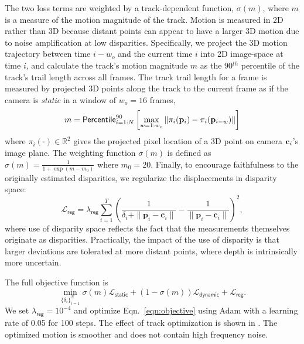 The two loss terms are weighted by a track-dependent function, $\sigma(m)$, where $m$ is a measure of the motion magnitude of the track. Motion is measured in 2D rather than 3D because distant points can appear to have a larger 3D motion due to noise amplification at low disparities.
Specifically, we project the 3D motion trajectory between time $i - w_o$ and the current time $i$ into 2D image-space at time $i$, %
and calculate the track's motion magnitude $m$ as the 90$^{th}$ percentile of the track's trail length across all frames. The track trail length for a frame is measured by projected 3D points along the track to the current frame as if the camera is \emph{static} in a window of $w_o=16$ frames, 
\begin{equation}
\label{eqn:trail_length_def}
    m = \mathsf{Percentile}_{i=1:N}^{90}\left[\max_{w=1:w_o}\|\pi_i(\mathbf{p}_i) - \pi_i(\mathbf{p}_{i-w})\|\right]
\end{equation}
where $\pi_i(\cdot)\in \mathbb{R}^2$ gives the projected pixel location of a 3D point on camera $\mathbf{c}_i$'s image plane.
The weighting function $\sigma(m)$ is defined as $\sigma(m) = \frac{1}{1 + \exp(m - m_0)}$ where $m_0 = 20$. 
Finally, to encourage faithfulness to the originally estimated disparities, we regularize the displacements in disparity space:
\begin{equation}
    \mathcal{L}_{\mathsf{reg}} = \lambda_{\mathsf{reg}} \sum_{i=1}^{T} \left( \frac{1}{\delta_i + \|\mathbf{p}_i-\mathbf{c}_i\|} - \frac{1}{\|\mathbf{p}_i-\mathbf{c}_i\|} \right)^2,
\end{equation}
where use of disparity space reflects the fact that the measurements themselves originate as disparities. Practically, the impact of the use of disparity is that larger deviations are tolerated at more distant points, where depth is intrinsically more uncertain.

The full objective function is
\begin{equation}
\min_{\{\delta_i\}_{i=1}^N} \sigma(m)\mathcal{L}_{\mathsf{static}} + (1-\sigma(m))\mathcal{L}_{\mathsf{dynamic}} + \mathcal{L}_{\mathsf{reg}}.
\label{eqn:objective}
\end{equation}
We set $\lambda_{\mathsf{reg}}=10^{-4}$ and optimize Eqn.~\ref{eqn:objective} using Adam with a learning rate of 0.05 for 100 steps.
The effect of track optimization is shown in . The optimized motion is smoother and does not contain high frequency noise.


